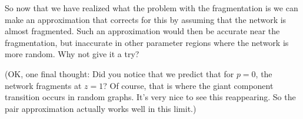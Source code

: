 So now that we have realized what the problem with the fragmentation is we can make an approximation that corrects for this by assuming that the network is almost fragmented. Such an approximation would then be accurate near the fragmentation, but inaccurate in other parameter regions where the network is more random. Why not give it a try? 

(OK, one final thought: Did you notice that we predict that for $p=0$, the network fragments at $z=1$? Of course, that is where the giant component transition occurs in random graphs. It's very nice to see this reappearing. So the pair approximation actually works well in this limit.)
